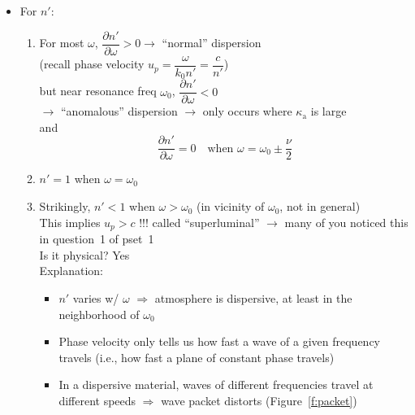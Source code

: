 \documentclass[11pt, oneside]{article}
\begin{document}
\begin{itemize}
\begin{itemize}
\begin{itemize}
			$\Rightarrow$ $\nu$ decreases to roughly $1/e$ of its surface value from surface to tropopause (${\sim}12$~km altitude)
		\end{itemize}
		\item For $n'$:
		\begin{enumerate}
			\item For most $\omega$, $\dfrac{\partial n'}{\partial\omega} > 0 \rightarrow$ ``normal'' dispersion\\
			(recall phase velocity $u_p = \dfrac{\omega}{k_0n'} = \dfrac{c}{n'}$)\\
			but near resonance freq $\omega_0$, $\dfrac{\partial n'}{\partial\omega} < 0$\\
			$\rightarrow$ ``anomalous'' dispersion $\rightarrow$ only occurs where $\kappa_\mathrm{a}$ is large\\
			and
			\begin{equation}
				\label{e:dndw}
				\frac{\partial n'}{\partial\omega} = 0 \quad \text{when } \omega = \omega_0 \pm \frac{\nu}{2}
			\end{equation}
			\item $n' = 1$ when $\omega = \omega_0$
			\item Strikingly, $n' < 1$ when $\omega > \omega_0$ (in vicinity of $\omega_0$, not in general)\\
			This implies $u_p > c$ !!! called ``superluminal'' $\rightarrow$ many of you noticed this in question~1 of pset~1\\
			Is it physical? Yes\\
			Explanation:
			\begin{itemize}
				\item $n'$ varies w/ $\omega$ $\Rightarrow$ atmosphere is dispersive, at least in the neighborhood of $\omega_0$
				\item Phase velocity only tells us how fast a wave of a given frequency travels (i.e., how fast a plane of constant phase travels)
				\item In a dispersive material, waves of different frequencies travel at different speeds $\Rightarrow$ wave packet distorts (Figure~\ref{f:packet})
			\end{itemize}
		\end{enumerate}
	\end{itemize}
\end{itemize}
\end{document}
